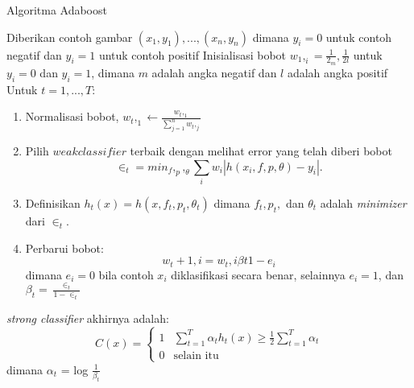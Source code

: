 \begin{algorithm}
  \caption{Algoritma Adaboost}
  \begin{algorithmic} [1]
    \State Diberikan contoh gambar $(x_1, y_1),...,(x_n, y_n)$ dimana 
    $y_i = 0$ untuk contoh negatif dan $y_i = 1$ untuk contoh positif
    \State Inisialisasi bobot $w_1,_i = \frac{1}{2_m}, \frac{1}{2l}$ 
    untuk $y_i = 0$ dan $y_i = 1$, dimana $m$ adalah angka negatif dan 
    $l$ adalah angka positif
    \State Untuk $t = 1,...,T$:
      \begin{enumerate}
        \item Normalisasi bobot, $w_t,_1 \gets \frac{w_t,_1}{\sum_{j=1}^{n} w_t,_j}$
        \item Pilih $weak classifier$ terbaik dengan melihat error yang telah diberi bobot
          \begin{equation}
            \in_t = min_f,_p,_\theta \sum_i w_i|h(x_i,f,p,\theta) - y_i|.
          \end{equation}
        \item Definisikan $h_t(x) = h(x,f_t,p_t,\theta_t)$ dimana $f_t,p_t,$ dan $\theta_t$ adalah \textit{minimizer} dari $\in_t$.
        \item Perbarui bobot:
          \begin{equation}
            w_t+1,i = w_t,i \beta{t}{1-e_i}
          \end{equation}
        dimana $e_i = 0$ bila contoh $x_i$ diklasifikasi secara benar, selainnya $e_i = 1$, dan $\beta_t = \frac{\in_t}{1-\in_t}$
      \end{enumerate}
      \State \textit{strong classifier} akhirnya adalah:
        \begin{equation}
          C(x) = \begin{cases}
            1 & \sum\limits_{t=1}^T \alpha_t h_t (x) \geq \frac{1}{2} \sum\limits_{t=1}^T \alpha_t \\
            0 & \text{selain itu}
          \end{cases}
        \end{equation}
      dimana $\alpha_t$ = log $\frac{1}{\beta_t}$ 
  \end{algorithmic}
\end{algorithm}

